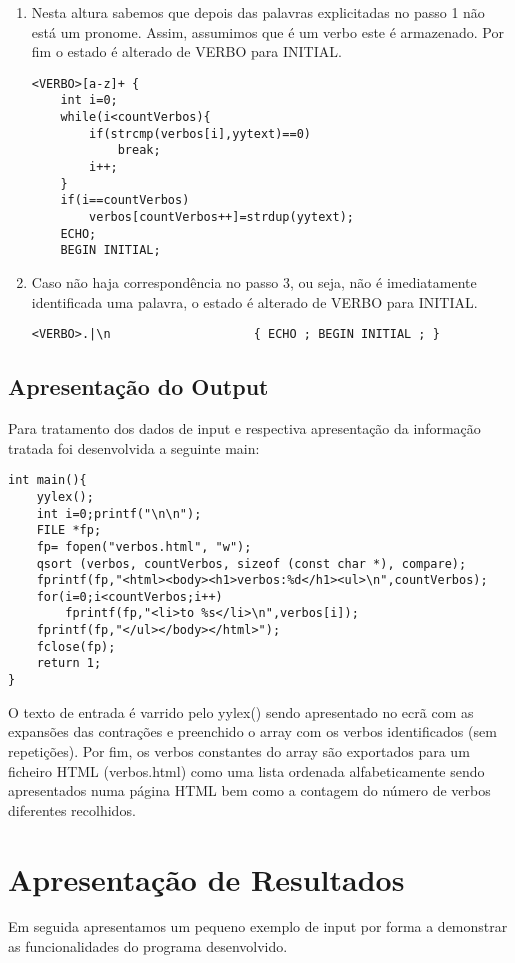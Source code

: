 \documentclass{report}
\begin{document}
\begin{enumerate}
\item Nesta altura sabemos que depois das palavras explicitadas no passo 1 não está um pronome. Assim, assumimos que é um verbo este é armazenado. Por fim o estado é alterado de VERBO para INITIAL.

\begin{verbatim}
<VERBO>[a-z]+ {
    int i=0;
    while(i<countVerbos){
        if(strcmp(verbos[i],yytext)==0)
            break;
        i++;
    }
    if(i==countVerbos)
        verbos[countVerbos++]=strdup(yytext);
    ECHO;
    BEGIN INITIAL;
\end{verbatim}

\item Caso não haja correspondência no passo 3, ou seja, não é imediatamente identificada uma palavra, o estado é alterado de VERBO para INITIAL.

\begin{verbatim}
<VERBO>.|\n                    { ECHO ; BEGIN INITIAL ; }
\end{verbatim}

\end{enumerate}
\section{Apresentação do Output}
Para tratamento dos dados de input e respectiva apresentação da informação tratada foi desenvolvida a seguinte main:

\begin{verbatim}
int main(){
    yylex();
    int i=0;printf("\n\n");
    FILE *fp;
    fp= fopen("verbos.html", "w");
    qsort (verbos, countVerbos, sizeof (const char *), compare);
    fprintf(fp,"<html><body><h1>verbos:%d</h1><ul>\n",countVerbos);
    for(i=0;i<countVerbos;i++)
        fprintf(fp,"<li>to %s</li>\n",verbos[i]);
    fprintf(fp,"</ul></body></html>");
    fclose(fp);
    return 1;
}
\end{verbatim}

O texto de entrada é varrido pelo yylex() sendo apresentado no ecrã com as expansões das contrações e preenchido o array com os verbos identificados (sem repetições). Por fim, os verbos constantes do array são exportados para um ficheiro HTML (verbos.html) como uma lista ordenada alfabeticamente sendo apresentados numa página HTML bem como a contagem do número de verbos diferentes recolhidos.
\chapter{Apresentação de Resultados}
Em seguida apresentamos um pequeno exemplo de input por forma a demonstrar as funcionalidades do programa desenvolvido.
\\
\\
\end{document}
